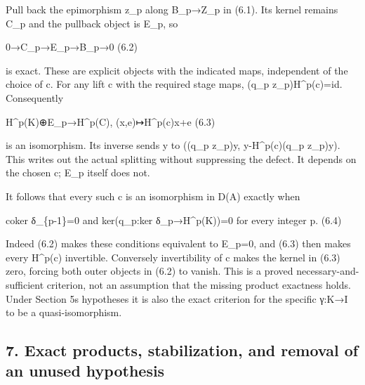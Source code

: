 \documentclass[11pt]{article}
\begin{document}
Pull back the epimorphism z\_\allowbreak{}p along B\_\allowbreak{}p\allowbreak{}→Z\_\allowbreak{}p in (6.1)\allowbreak{}. Its kernel remains C\_\allowbreak{}p and the pullback object is E\_\allowbreak{}p,\allowbreak{} so

0\allowbreak{}→C\_\allowbreak{}p\allowbreak{}→E\_\allowbreak{}p\allowbreak{}→B\_\allowbreak{}p\allowbreak{}→0 (6.2)\allowbreak{}

is exact. These are explicit objects with the indicated maps,\allowbreak{} independent of the choice of c. For any lift c with the required stage maps,\allowbreak{} (q\_\allowbreak{}p z\_\allowbreak{}p)\allowbreak{}H\textasciicircum{}p(c)\allowbreak{}\allowbreak{}=id. Consequently

H\textasciicircum{}p(K)\allowbreak{}\allowbreak{}⊕E\_\allowbreak{}p\allowbreak{}→H\textasciicircum{}p(C)\allowbreak{},\allowbreak{} (x,\allowbreak{}e)\allowbreak{}\allowbreak{}↦H\textasciicircum{}p(c)\allowbreak{}x\allowbreak{}+e (6.3)\allowbreak{}

is an isomorphism. Its inverse sends y to ((q\_\allowbreak{}p z\_\allowbreak{}p)\allowbreak{}y,\allowbreak{} y-H\textasciicircum{}p(c)\allowbreak{}(q\_\allowbreak{}p z\_\allowbreak{}p)\allowbreak{}y)\allowbreak{}. This writes out the actual splitting without suppressing the defect. It depends on the chosen c; E\_\allowbreak{}p itself does not.

It follows that every such c is an isomorphism in D(A)\allowbreak{} exactly when

coker δ\_\allowbreak{}\{p-1\}\allowbreak{}=0 and ker(q\_\allowbreak{}p:\allowbreak{}ker δ\_\allowbreak{}p\allowbreak{}→H\textasciicircum{}p(K)\allowbreak{})\allowbreak{}\allowbreak{}=0 for every integer p. (6.4)\allowbreak{}

Indeed (6.2)\allowbreak{} makes these conditions equivalent to E\_\allowbreak{}p\allowbreak{}=0,\allowbreak{} and (6.3)\allowbreak{} then makes every H\textasciicircum{}p(c)\allowbreak{} invertible. Conversely invertibility of c makes the kernel in (6.3)\allowbreak{} zero,\allowbreak{} forcing both outer objects in (6.2)\allowbreak{} to vanish. This is a proved necessary-and-sufficient criterion,\allowbreak{} not an assumption that the missing product exactness holds. Under Section 5\textquotesingle s hypotheses it is also the exact criterion for the specific γ:\allowbreak{}K\allowbreak{}→I to be a quasi-isomorphism.

\subsection{\texorpdfstring{7. Exact products,\allowbreak{} stabilization,\allowbreak{} and removal of an unused hypothesis}{7. Exact   and removal of an unused hypothesis}}\label{proofs-10435-10686-exact-products-stabilization-and-removal-of-an-unused-hypothesis}
\end{document}
